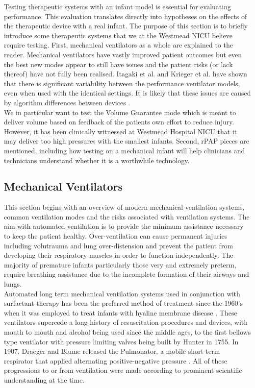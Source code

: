 \documentclass[12pt, openany, oneside]{book}
\begin{document}
Testing therapeutic systems with an infant model is essential for evaluating performance. This evaluation translates directly into hypotheses on the effects of the therapeutic device with a real infant. The purpose of this section is to briefly introduce some therapeutic systems that we at the Westmead NICU believe require testing. First, mechanical ventilators as a whole are explained to the reader. Mechanical ventilators have vastly improved patient outcomes but even the best new modes appear to still have issues and the patient risks (or lack thereof) have not fully been realised. Itagaki et al. and Krieger et al. have shown that there is significant variability between the performance ventilator models, even when used with the identical settings. It is likely that these issues are caused by algorithm differences between devices \citep{itagaki2017effects, krieger2017volume}. \\

We in particular want to test the Volume Guarantee mode which is meant to deliver volume based on feedback of the patients own effort to reduce injury. However, it has been clinically witnessed at Westmead Hospital NICU that it may deliver too high pressures with the smallest infants. Second, rPAP pieces are mentioned, including how testing on a mechanical infant will help clinicians and technicians understand whether it is a worthwhile technology.



\subsection{Mechanical Ventilators}

This section begins with an overview of modern mechanical ventilation systems, common ventilation modes and the risks associated with ventilation systems. The aim with automated ventilation is to provide the minimum assistance necessary to keep the patient healthy. Over-ventilation can cause permanent injuries including volutrauma and lung over-distension \cite{mccallion2008} and prevent the patient from developing their respiratory muscles in order to function independently. The majority of premature infants particularly those very and extremely preterm, require breathing assistance due to the incomplete formation of their airways and lungs.\\

Automated long term mechanical ventilation systems used in conjunction with surfactant therapy has been the preferred method of treatment since the 1960's when it was employed to treat infants with hyaline membrane disease \cite{evidence}. These ventilators supercede a long history of resuscitation procedures and devices, with mouth to mouth and alcohol being used since the middle ages, to the first bellows type ventilator with pressure limiting valves being built by Hunter in 1755. In 1907, Draeger and Blume released the Pulmonator, a mobile short-term respirator that applied alternating positive-negative pressure \cite{history1}. All of these progressions to or from ventilation were made according to prominent scientific understanding at the time. \\
\end{document}
